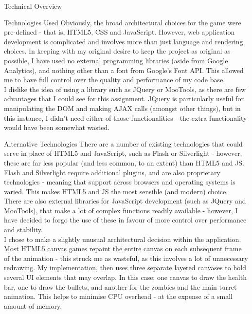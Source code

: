 \documentclass[11pt]{article}
\begin{document}
\begin{section}{Technical Overview}
    \begin{subsection}{Technologies Used}
    		Obviously, the broad architectural choices for the game were pre-defined - that is, HTML5, CSS and JavaScript. However, web application development is complicated and involves more than just language and rendering choices. In keeping with my original desire to keep the project as original as possible, I have used no external programming libraries (aside from Google Analytics\cite{GAnalytics}), and nothing other than a font from Google's Font API\cite{GFonts}. This allowed me to have full control over the quality and performance of my code base. \\
    		
    		I dislike the idea of using a library such as JQuery or MooTools, as there are few advantages that I could see for this assignment. JQuery is particularly useful for manipulating the DOM and making AJAX calls (amongst other things), but in this instance, I didn't need either of those functionalities - the extra functionality would have been somewhat wasted.
    \end{subsection}
    
    \begin{subsection}{Alternative Technologies}
    		There are a number of existing technologies that could serve in place of HTML5 and JavaScript, such as Flash or Silverlight - however, these are far less popular (and less common, to an extent) than HTML5 and JS. Flash and Silverlight require additional plugins, and are also proprietary technologies - meaning that support across browsers and operating systems is varied. This makes HTML5 and JS the most sensible (and modern) choice. \\
    		
    		There are also external libraries for JavaScript development (such as JQuery and MooTools), that make a lot of complex functions readily available - however, I have decided to forgo the use of these in favour of more control over performance and stability. \\
    		
    		I chose to make a slightly unusual architectural decision within the application. Most HTML5 canvas games repaint the entire canvas on each subsequent frame of the animation - this struck me as wasteful, as this involves a lot of unnecessary redrawing. My implementation, then uses three separate layered canvases to hold several UI elements that may overlap. In this case; one canvas to draw the health bar, one to draw the bullets, and another for the zombies and the main turret animation. This helps to minimise CPU overhead - at the expense of a small amount of memory.
    \end{subsection}
\end{section}
    
\end{document}
